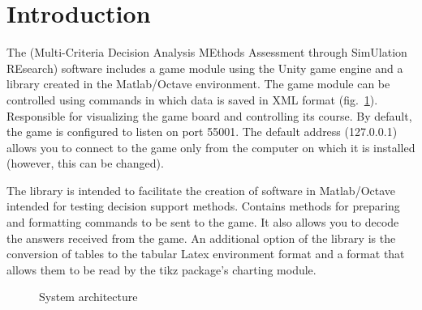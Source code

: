 
\section{Introduction}

The \SoftwareName (Multi-Criteria Decision Analysis MEthods Assessment through SimUlation REsearch) software includes a game module using the Unity game engine and a library created in the Matlab/Octave environment. The game module can be controlled using commands in which data is saved in XML format (fig.~\ref{Fig:architecture}). Responsible for visualizing the game board and controlling its course. By default, the game is configured to listen on port 55001. The default address (127.0.0.1) allows you to connect to the game only from the computer on which it is installed (however, this can be changed).

The library is intended to facilitate the creation of software in Matlab/Octave intended for testing decision support methods. Contains methods for preparing and formatting commands to be sent to the game. It also allows you to decode the answers received from the game. An additional option of the library is the conversion of tables to the tabular Latex environment format and a format that allows them to be read by the tikz package's charting module.

\begin{figure}

\caption{System architecture}
\label{Fig:architecture}
\end{figure}